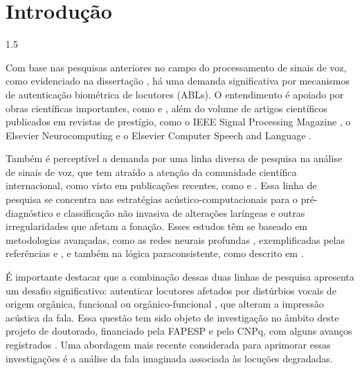 \documentclass[a4paper,12pt,openright,oneside]{book}
\newenvironment{myenv}[1]
  {\begin{spacing}{#1}}
  {\end{spacing}}
\begin{document}
	\mainmatter
	\setlength{\parindent}{1.25cm}

	\chapter{Introdução}
		\label{ch:intro}
		\begin{myenv}{1.5}
			\setcounter{page}{12}
			\par Com base nas pesquisas anteriores no campo do processamento de sinais de voz, como evidenciado na dissertação \cite{furlan2021caracterizacao}, há uma demanda significativa por mecanismos de autenticação biométrica de locutores (ABLs). O entendimento é apoiado por obras científicas importantes, como \cite{beigi2011speaker} e \cite{neustein2012forensic}, além do volume de artigos científicos publicados em revistas de prestígio, como o IEEE Signal Processing Magazine \cite{hansen2015speaker}, o Elsevier Neurocomputing \cite{wang2022racp} e o Elsevier Computer Speech and Language \cite{lee2020two}.\newline
			
			\par Também é perceptível a demanda por uma linha diversa de pesquisa na análise de sinais de voz, que tem atraído a atenção da comunidade científica internacional, como visto em publicações recentes, como \cite{chaiani2022voice} e \cite{fujimura2022classification}. Essa linha de pesquisa se concentra nas estratégias acústico-computacionais para o pré-diagnóstico e classificação não invasiva de alterações laríngeas e outras irregularidades que afetam a fonação. Esses estudos têm se baseado em metodologias avançadas, como as redes neurais profundas \cite{goodfellow2016deep}, exemplificadas pelas referências \cite{mittal2021deep} e \cite{miliaresi2021combining}, e também na lógica paraconsistente, como descrito em \cite{fonseca2017linear}.\newline
			
			\par É importante destacar que a combinação dessas duas linhas de pesquisa apresenta um desafio significativo: autenticar locutores afetados por distúrbios vocais de origem orgânica, funcional ou orgânico-funcional \cite{le2005voz} \cite{le2005voz2}, que alteram a impressão acústica da fala. Essa questão tem sido objeto de investigação no âmbito deste projeto de doutorado, financiado pela FAPESP e pelo CNPq, com alguns avanços registrados \cite{gupta2021residual}. Uma abordagem mais recente considerada para aprimorar essas investigações é a análise da fala imaginada \cite{moctezuma2019subjects} associada às locuções degradadas.\newline
			

\end{myenv}
\end{document}
